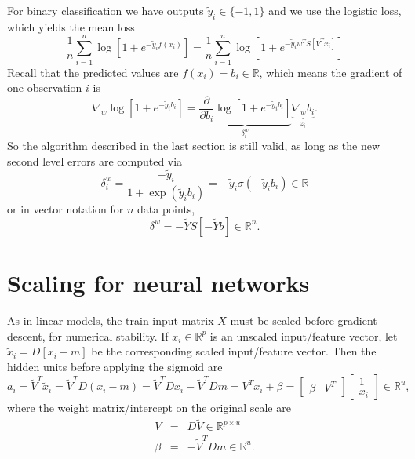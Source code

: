 \documentclass{article}
\begin{document}
For binary classification we have outputs $\tilde y_i \in \{-1, 1\}$
and we use the logistic loss, which yields the mean loss
\begin{equation}
  \label{eq:mean_NN_binary_loss}
  \frac 1 n \sum_{i=1}^n \log[ 1+ e^{ -\tilde y_i f(x_i) } ] =
  \frac 1 n \sum_{i=1}^n \log[ 1+ e^{ -\tilde y_i w^T S[V^T x_i] } ] 
\end{equation}
Recall that the predicted values are $f(x_i) = b_i\in\mathbb R$, which means the gradient of one observation $i$ is
\begin{equation}
  \label{eq:grad_w_binary}
  \nabla_w \log[ 1+ e^{ -\tilde y_i b_i } ] =
\underbrace{
  \frac{\partial}{\partial b_i} \log[ 1+ e^{ -\tilde y_i b_i } ]
}_{\delta_i^w}
\underbrace{
  \nabla_w b_i
}_{z_i}.
\end{equation}
So the algorithm described in the last section is still valid, as long
as the new second level errors are computed via
\begin{equation}
  \label{eq:delta_i_w_binary}
  \delta_i^w = \frac{-\tilde y_i}{1+\exp(\tilde y_i b_i)} = -\tilde y_i\sigma(-\tilde y_i b_i)\in\mathbb R
\end{equation}
or in vector notation for $n$ data points,
\begin{equation}
  \label{eq:delta_w_binary}
  \delta^w = -\tilde Y S[ -\tilde Y b ]\in \mathbb R^n.
\end{equation}

\section{Scaling for neural networks}

As in linear models, the train input matrix $X$ must be scaled before
gradient descent, for numerical stability. If $x_i\in\mathbb R^p$ is
an unscaled input/feature vector, let $\tilde x_i = D[x_i - m]$ be the
corresponding scaled input/feature vector. Then the hidden units
before applying the sigmoid are
\begin{equation}
  \label{eq:nn_scaled_prediction}
  a_i = \tilde V^T \tilde x_i = 
  \tilde V^T D (x_i - m) = \tilde V^T D x_i - \tilde V^T D m = 
  V^T x_i + \beta = 
  \left[\begin{array}{cc}
          \beta & V^T
  \end{array}\right]
  \left[\begin{array}{c}
          1 \\ x_i
  \end{array}\right]
\in\mathbb R^u,
\end{equation}
where the weight matrix/intercept on the original scale are
\begin{eqnarray*}
  V &=& D \tilde V\in \mathbb R^{p \times u}\\
  \beta &=& - \tilde V^T D m\in \mathbb R^u.
\end{eqnarray*}
\end{document}
